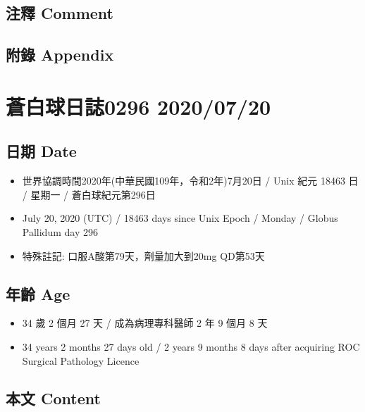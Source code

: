 \documentclass[a5paper, 11pt
]{book}
\providecommand{\tightlist}{%
  \setlength{\itemsep}{0pt}\setlength{\parskip}{0pt}}
\begin{document}
\hypertarget{ux6ce8ux91cb-comment-48}{%
\subsection{注釋 Comment}\label{ux6ce8ux91cb-comment-48}}

\hypertarget{ux9644ux9304-appendix-48}{%
\subsection{附錄 Appendix}\label{ux9644ux9304-appendix-48}}

\hypertarget{ux84bcux767dux7403ux65e5ux8a8c0296-20200720}{%
\section{蒼白球日誌0296
2020/07/20}\label{ux84bcux767dux7403ux65e5ux8a8c0296-20200720}}

\hypertarget{ux65e5ux671f-date-49}{%
\subsection{日期 Date}\label{ux65e5ux671f-date-49}}

\begin{itemize}
\tightlist
\item
  世界協調時間2020年(中華民國109年，令和2年)7月20日 / Unix 紀元 18463 日
  / 星期一 / 蒼白球紀元第296日
\item
  July 20, 2020 (UTC) / 18463 days since Unix Epoch / Monday / Globus
  Pallidum day 296
\item
  特殊註記: 口服A酸第79天，劑量加大到20mg QD第53天
\end{itemize}

\hypertarget{ux5e74ux9f61-age-49}{%
\subsection{年齡 Age}\label{ux5e74ux9f61-age-49}}

\begin{itemize}
\tightlist
\item
  34 歲 2 個月 27 天 / 成為病理專科醫師 2 年 9 個月 8 天
\item
  34 years 2 months 27 days old / 2 years 9 months 8 days after
  acquiring ROC Surgical Pathology Licence
\end{itemize}

\hypertarget{ux672cux6587-content-49}{%
\subsection{本文 Content}\label{ux672cux6587-content-49}}
\end{document}
